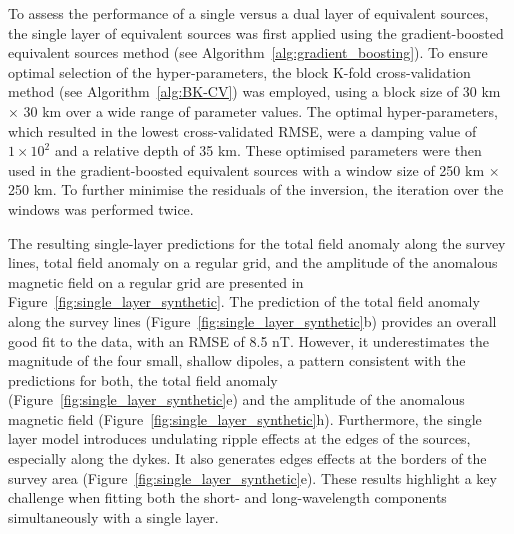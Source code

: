 To assess the performance of a single versus a dual layer of equivalent sources, the single layer of equivalent sources was first applied using the gradient-boosted equivalent sources method (see Algorithm~\ref{alg:gradient_boosting}). To ensure optimal selection of the hyper-parameters, the block K-fold cross-validation method (see Algorithm~\ref{alg:BK-CV}) was employed, using a block size of 30 km $\times$ 30 km over a wide range of parameter values. The optimal hyper-parameters, which resulted in the lowest cross-validated RMSE, were a damping value of $1 \times 10^{2}$ and a relative depth of 35 km. These optimised parameters were then used in the gradient-boosted equivalent sources with a window size of 250 km $\times$ 250 km. To further minimise the residuals of the inversion, the iteration over the windows was performed twice. 

The resulting single-layer predictions for the total field anomaly along the survey lines, total field anomaly on a regular grid, and the amplitude of the anomalous magnetic field on a regular grid are presented in Figure~\ref{fig:single_layer_synthetic}. The prediction of the total field anomaly along the survey lines (Figure~\ref{fig:single_layer_synthetic}b) provides an overall good fit to the data, with an RMSE of 8.5 nT. However, it underestimates the magnitude of the four small, shallow dipoles, a pattern consistent with the predictions for both, the total field anomaly (Figure~\ref{fig:single_layer_synthetic}e) and the amplitude of the anomalous magnetic field (Figure~\ref{fig:single_layer_synthetic}h). Furthermore, the single layer model introduces undulating ripple effects at the edges of the sources, especially along the dykes. It also generates edges effects at the borders of the survey area (Figure~\ref{fig:single_layer_synthetic}e). These results highlight a key challenge when fitting both the short- and long-wavelength components simultaneously with a single layer.

